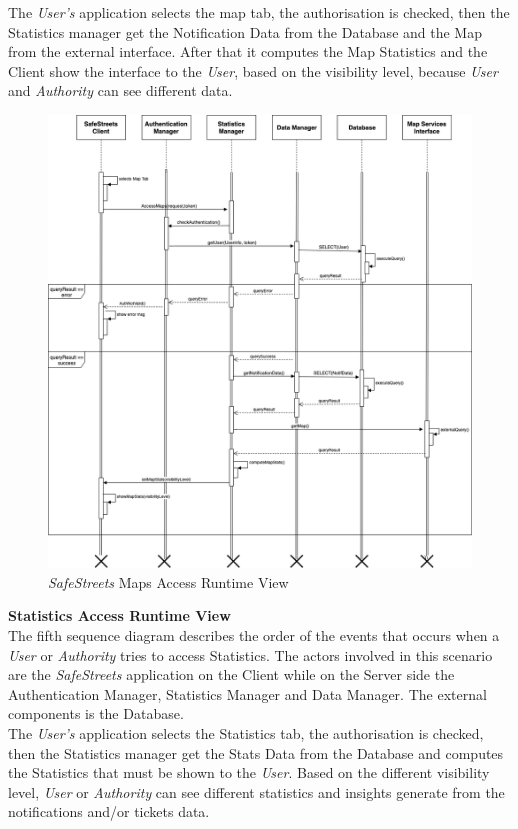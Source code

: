 \documentclass{article}
\begin{document}
	The {\it User's} application selects the map tab, the authorisation is checked, then the Statistics manager get the Notification Data from the Database and the Map from the external interface. After that it computes the Map Statistics and the Client show the interface to the {\it User}, based on the visibility level, because {\it User} and {\it Authority} can see different data.
	\begin{figure}[H]
			\centering
			\includegraphics[scale=0.33]{Images/Diagrams/Runtime/maps_runtime.png}
			\caption{{\it SafeStreets} Maps Access Runtime View}
	\end{figure}
	\pagebreak
	\noindent
	{\bf Statistics Access Runtime View} \\
	The fifth sequence diagram describes the order of the events that occurs when a {\it User} or {\it Authority} tries to access Statistics. The actors involved in this scenario are the {\it SafeStreets} application on the Client while on the Server side the Authentication Manager, Statistics Manager and Data Manager. The external components is the Database. \\ 
	The {\it User's} application selects the Statistics tab, the authorisation is checked, then the Statistics manager get the Stats Data from the Database and computes the Statistics that must be shown to the {\it User}. Based on the different visibility level, {\it User} or {\it Authority} can see different statistics and insights generate from the notifications and/or tickets data.
\end{document}

